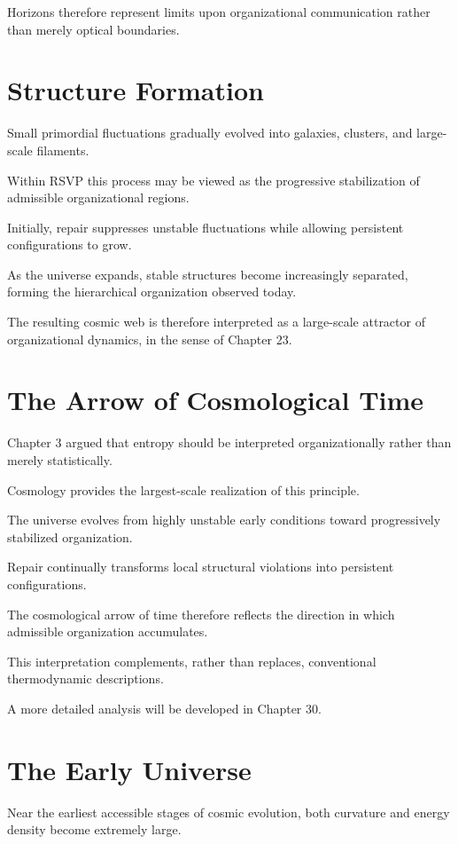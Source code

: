 \documentclass[11pt,oneside]{book}
\numberwithin{equation}{chapter}
\theoremstyle{definition}
\theoremstyle{plain}
\begin{document}
Horizons therefore represent limits upon organizational communication rather
than merely optical boundaries.

\section{Structure Formation}

Small primordial fluctuations gradually evolved into galaxies, clusters, and
large-scale filaments.

Within RSVP this process may be viewed as the progressive stabilization of
admissible organizational regions.

Initially, repair suppresses unstable fluctuations while allowing persistent
configurations to grow.

As the universe expands, stable structures become increasingly separated,
forming the hierarchical organization observed today.

The resulting cosmic web is therefore interpreted as a large-scale attractor
of organizational dynamics, in the sense of Chapter 23.

\section{The Arrow of Cosmological Time}

Chapter 3 argued that entropy should be interpreted organizationally rather
than merely statistically.

Cosmology provides the largest-scale realization of this principle.

The universe evolves from highly unstable early conditions toward
progressively stabilized organization.

Repair continually transforms local structural violations into persistent
configurations.

The cosmological arrow of time therefore reflects the direction in which
admissible organization accumulates.

This interpretation complements, rather than replaces, conventional
thermodynamic descriptions.

A more detailed analysis will be developed in Chapter 30.

\section{The Early Universe}

Near the earliest accessible stages of cosmic evolution, both curvature and
energy density become extremely large.
\end{document}
